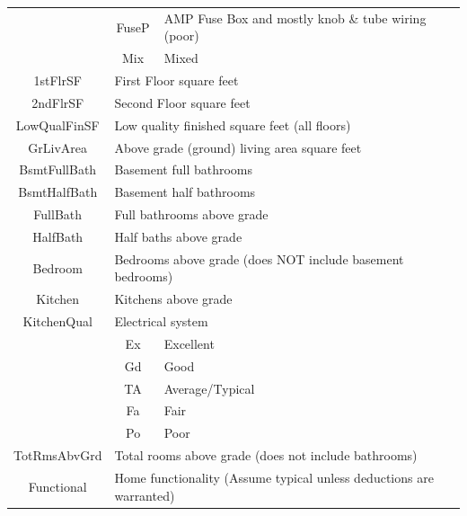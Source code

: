 \documentclass[11pt]{scrartcl} %
\begin{document}
\begin{center}
\begin{tabular}{c c c c c c}
\multicolumn{2}{|c}{} & \multicolumn{1}{c}{FuseP} & \multicolumn{3}{l|}{AMP Fuse Box and mostly knob \& tube wiring (poor)}\\
\multicolumn{2}{|c}{} & \multicolumn{1}{c}{Mix} & \multicolumn{3}{l|}{Mixed}\\
\hline
\multicolumn{2}{|c}{1stFlrSF} & \multicolumn{4}{l|}{First Floor square feet}\\
\hline
\multicolumn{2}{|c}{2ndFlrSF} & \multicolumn{4}{l|}{Second Floor square feet}\\
\hline
\multicolumn{2}{|c}{LowQualFinSF} & \multicolumn{4}{l|}{Low quality finished square feet (all floors)}\\
\hline
\multicolumn{2}{|c}{GrLivArea} & \multicolumn{4}{l|}{Above grade (ground) living area square feet}\\
\hline
\multicolumn{2}{|c}{BsmtFullBath} & \multicolumn{4}{l|}{Basement full bathrooms}\\
\hline
\multicolumn{2}{|c}{BsmtHalfBath} & \multicolumn{4}{l|}{Basement half bathrooms}\\
\hline
\multicolumn{2}{|c}{FullBath} & \multicolumn{4}{l|}{Full bathrooms above grade}\\
\hline
\multicolumn{2}{|c}{HalfBath} & \multicolumn{4}{l|}{Half baths above grade}\\
\hline
\multicolumn{2}{|c}{Bedroom} & \multicolumn{4}{l|}{Bedrooms above grade (does NOT include basement bedrooms)}\\
\hline
\multicolumn{2}{|c}{Kitchen} & \multicolumn{4}{l|}{Kitchens above grade}\\
\hline
\multicolumn{2}{|c}{KitchenQual} & \multicolumn{4}{l|}{Electrical system}\\ 
\multicolumn{2}{|c}{} & \multicolumn{1}{c}{Ex} & \multicolumn{3}{l|}{Excellent}\\
\multicolumn{2}{|c}{} & \multicolumn{1}{c}{Gd} & \multicolumn{3}{l|}{Good}\\
\multicolumn{2}{|c}{} & \multicolumn{1}{c}{TA} & \multicolumn{3}{l|}{Average/Typical}\\
\multicolumn{2}{|c}{} & \multicolumn{1}{c}{Fa} & \multicolumn{3}{l|}{Fair}\\
\multicolumn{2}{|c}{} & \multicolumn{1}{c}{Po} & \multicolumn{3}{l|}{Poor}\\
\hline
\multicolumn{2}{|c}{TotRmsAbvGrd} & \multicolumn{4}{l|}{Total rooms above grade (does not include bathrooms)}\\
\hline
\multicolumn{2}{|c}{Functional} & \multicolumn{4}{l|}{Home functionality (Assume typical unless deductions are warranted)}\\ 

\end{tabular}
\end{center}
\end{document}
